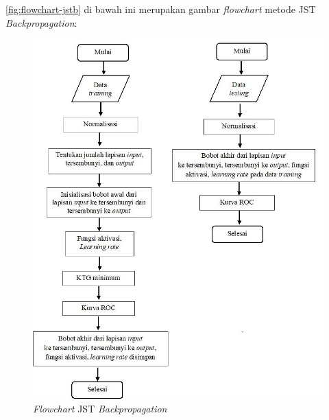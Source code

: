 \autoref{fig:flowchart-jstb} di bawah ini merupakan gambar \textit{flowchart} metode JST \textit{Backpropagation}:

\begin{figure}[H]
    \centering
    \includegraphics[width=.6\linewidth]{image/Flowchart JST Backpropagation.jpg}
    \caption{\textit{Flowchart} JST \textit{Backpropagation}}
    \label{fig:flowchart-jstb}
\end{figure}